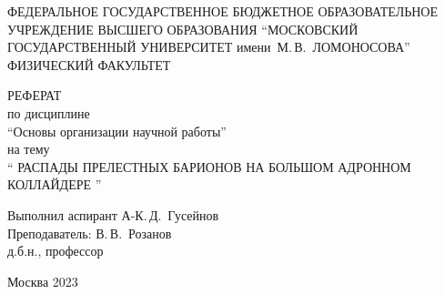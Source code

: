 \thispagestyle{empty}

\noindent\parbox[t][0pt][t]{\textwidth}{
  \centering
  ФЕДЕРАЛЬНОЕ ГОСУДАРСТВЕННОЕ БЮДЖЕТНОЕ
  ОБРАЗОВАТЕЛЬНОЕ УЧРЕЖДЕНИЕ ВЫСШЕГО ОБРАЗОВАНИЯ
  \enquote{МОСКОВСКИЙ ГОСУДАРСТВЕННЫЙ УНИВЕРСИТЕТ
  имени~М.\,В.~ЛОМОНОСОВА}
  \\[.5\baselineskip]
  ФИЗИЧЕСКИЙ ФАКУЛЬТЕТ
}

\vspace{.25\textheight}

\begin{center}
  РЕФЕРАТ
  \\[-.2\baselineskip] по дисциплине
  \\[-.2\baselineskip] \enquote{Основы организации научной работы}
  \\[-.2\baselineskip] на тему
  \\ \enquote{%
    РАСПАДЫ ПРЕЛЕСТНЫХ БАРИОНОВ НА БОЛЬШОМ АДРОННОМ КОЛЛАЙДЕРЕ%
  }
\end{center}


\noindent Выполнил аспирант
\hfill А-К.\,Д.~Гусейнов
\\[1\baselineskip]
\noindent Преподаватель:
\hfill В.\,В.~Розанов
\\[-.3\baselineskip]
\hspace*{\fill} {д.б.н., профессор}

\begin{center}
  Москва 2023
\end{center}
